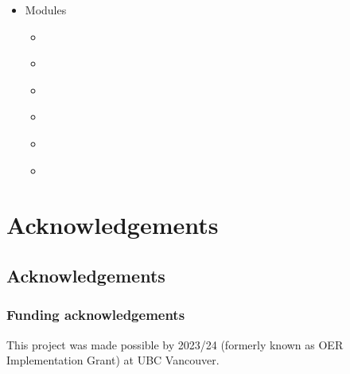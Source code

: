 \documentclass[letterpaper,10pt,english]{jupyterBook}
\begin{document}
\begin{itemize}
\item {} 
\sphinxAtStartPar
Modules

\begin{itemize}
\item {} 
\sphinxAtStartPar
{\hyperref[\detokenize{notebooks/Chapter1/chapter1::doc}]{}}

\item {} 
\sphinxAtStartPar
{\hyperref[\detokenize{notebooks/Chapter2/thermo-properties::doc}]{}}

\item {} 
\sphinxAtStartPar
{\hyperref[\detokenize{notebooks/Chapter3/chapter3::doc}]{}}

\item {} 
\sphinxAtStartPar
{\hyperref[\detokenize{notebooks/Chapter4/first-law::doc}]{}}

\item {} 
\sphinxAtStartPar
{\hyperref[\detokenize{notebooks/Chapter5/chapter5::doc}]{}}

\item {} 
\sphinxAtStartPar
{\hyperref[\detokenize{notebooks/Chapter6/chapter6::doc}]{}}

\end{itemize}
\end{itemize}

\sphinxstepscope


\part{Acknowledgements}

\sphinxstepscope


\chapter{Acknowledgements}
\label{\detokenize{notebooks/ack/ack:acknowledgements}}\label{\detokenize{notebooks/ack/ack::doc}}

\section{Funding acknowledgements}
\label{\detokenize{notebooks/ack/ack:funding-acknowledgements}}
\sphinxAtStartPar
This project was made possible by 2023/24  (formerly known as OER Implementation Grant) at UBC Vancouver.
\end{document}
